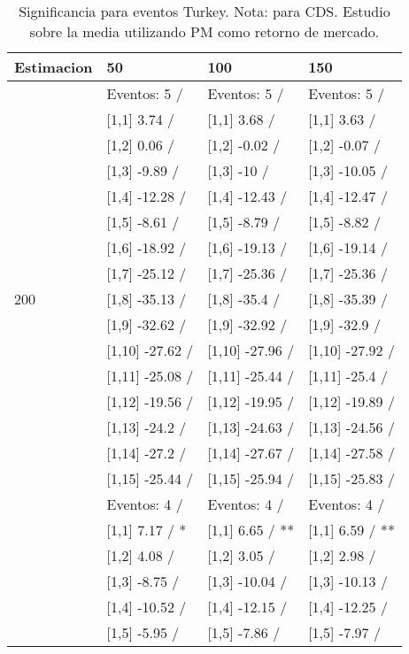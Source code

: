 \begin{table}

\caption{Significancia para eventos Turkey. Nota: para CDS. Estudio sobre la media utilizando PM como retorno de mercado.}
\centering
\begin{tabular}[t]{llll}
\toprule
Estimacion & 50 & 100 & 150\\
\midrule
 & Eventos:  5 / & Eventos:  5 / & Eventos:  5 /\\
 & {}[1,1] 3.74  / & {}[1,1] 3.68  / & {}[1,1] 3.63  /\\
 & {}[1,2] 0.06  / & {}[1,2] -0.02  / & {}[1,2] -0.07  /\\
 & {}[1,3] -9.89  / & {}[1,3] -10  / & {}[1,3] -10.05  /\\
 & {}[1,4] -12.28  / & {}[1,4] -12.43  / & {}[1,4] -12.47  /\\
\addlinespace
 & {}[1,5] -8.61  / & {}[1,5] -8.79  / & {}[1,5] -8.82  /\\
 & {}[1,6] -18.92  / & {}[1,6] -19.13  / & {}[1,6] -19.14  /\\
 & {}[1,7] -25.12  / & {}[1,7] -25.36  / & {}[1,7] -25.36  /\\
200 & {}[1,8] -35.13  / & {}[1,8] -35.4  / & {}[1,8] -35.39  /\\
 & {}[1,9] -32.62  / & {}[1,9] -32.92  / & {}[1,9] -32.9  /\\
\addlinespace
 & {}[1,10] -27.62  / & {}[1,10] -27.96  / & {}[1,10] -27.92  /\\
 & {}[1,11] -25.08  / & {}[1,11] -25.44  / & {}[1,11] -25.4  /\\
 & {}[1,12] -19.56  / & {}[1,12] -19.95  / & {}[1,12] -19.89  /\\
 & {}[1,13] -24.2  / & {}[1,13] -24.63  / & {}[1,13] -24.56  /\\
 & {}[1,14] -27.2  / & {}[1,14] -27.67  / & {}[1,14] -27.58  /\\
\addlinespace
 & {}[1,15] -25.44  / & {}[1,15] -25.94  / & {}[1,15] -25.83  /\\
 & Eventos:  4 / & Eventos:  4 / & Eventos:  4 /\\
 & {}[1,1] 7.17  / * & {}[1,1] 6.65  / ** & {}[1,1] 6.59  / **\\
 & {}[1,2] 4.08  / & {}[1,2] 3.05  / & {}[1,2] 2.98  /\\
 & {}[1,3] -8.75  / & {}[1,3] -10.04  / & {}[1,3] -10.13  /\\
\addlinespace
 & {}[1,4] -10.52  / & {}[1,4] -12.15  / & {}[1,4] -12.25  /\\
 & {}[1,5] -5.95  / & {}[1,5] -7.86  / & {}[1,5] -7.97  /\\

\end{tabular}
\end{table}
